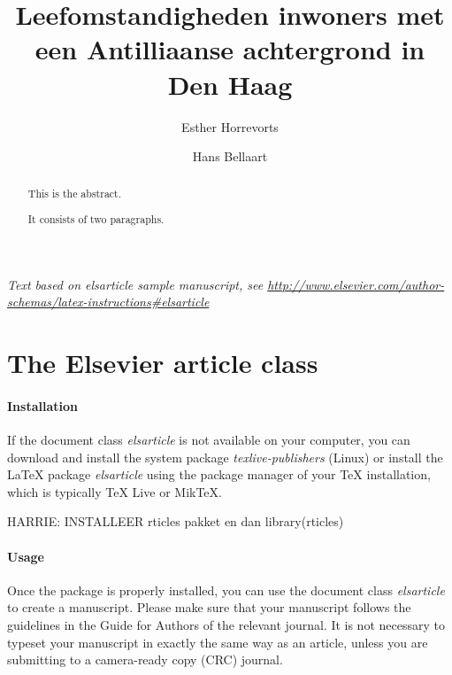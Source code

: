 \documentclass[]{elsarticle} %
\begin{document}
\begin{frontmatter}

  \title{Leefomstandigheden inwoners met een Antilliaanse achtergrond in Den Haag}
    \author[Verwey-Jonker Instituut]{Esther Horrevorts}
    \author[Verwey-Jonker Instituut]{Hans Bellaart}
  
      \address[Verwey-Jonker Instituut]{Kromme Nieuwegracht 6, 3512HG, Utrecht}
  
  \begin{abstract}
  This is the abstract.
  
  It consists of two paragraphs.
  \end{abstract}
  
 \end{frontmatter}

\emph{Text based on elsarticle sample manuscript, see
\url{http://www.elsevier.com/author-schemas/latex-instructions\#elsarticle}}

\hypertarget{the-elsevier-article-class}{%
\section{The Elsevier article class}\label{the-elsevier-article-class}}

\hypertarget{installation}{%
\paragraph{Installation}\label{installation}}

If the document class \emph{elsarticle} is not available on your
computer, you can download and install the system package
\emph{texlive-publishers} (Linux) or install the LaTeX package
\emph{elsarticle} using the package manager of your TeX installation,
which is typically TeX Live or MikTeX.

HARRIE: INSTALLEER rticles pakket en dan library(rticles)

\hypertarget{usage}{%
\paragraph{Usage}\label{usage}}

Once the package is properly installed, you can use the document class
\emph{elsarticle} to create a manuscript. Please make sure that your
manuscript follows the guidelines in the Guide for Authors of the
relevant journal. It is not necessary to typeset your manuscript in
exactly the same way as an article, unless you are submitting to a
camera-ready copy (CRC) journal.
\end{document}
